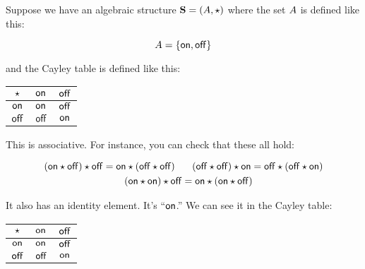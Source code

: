 \documentclass[../../../main.tex]{subfiles}
\begin{document}
\begin{fexample}

Suppose we have an algebraic structure $\algebra{S} = (\set{A}, \opSymbol/)$ where the set $A$ is defined like this:

\begin{equation*}
  A = \{ \mathsf{on}, \mathsf{off} \}
\end{equation*}

and the Cayley table is defined like this:

\begin{center}
  \begin{tabular}{| c || c | c | }
    \hline
    $\opSymbol/$ & $\mathsf{on}$  & $\mathsf{off}$ \\ \hline \hline
    $\mathsf{on}$     & $\mathsf{on}$  & $\mathsf{off}$ \\ \hline
    $\mathsf{off}$    & $\mathsf{off}$ & $\mathsf{on}$ \\ \hline
  \end{tabular}
\end{center}

This is associative. For instance, you can check that these all hold:

\begin{align*}
  \op{(\op{\e{on}}{\e{off}})}{\e{off}} = \op{\e{on}}{(\op{\e{off}}{\e{off}})} \hskip 0.25cm &~ \hskip 0.25cm
  \op{(\op{\e{off}}{\e{off}})}{\e{on}} = \op{\e{off}}{(\op{\e{off}}{\e{on}})} \\
  \op{(\op{\e{on}}{\e{on}})}{\e{off}} &= \op{\e{on}}{(\op{\e{on}}{\e{off}})}
\end{align*}

It also has an identity element. It's ``$\mathsf{on}$.'' We can see it in the Cayley table:

\begin{center}
  \begin{tabular}{| c || c | c | }
    \hline
    $\opSymbol/$ & $\mathsf{on}$  & $\mathsf{off}$ \\ \hline \hline
    $\mathsf{on}$     & \cellcolor{grey3} $\mathsf{on}$  & \cellcolor{grey3} $\mathsf{off}$ \\ \hline
    $\mathsf{off}$    & \cellcolor{grey3} $\mathsf{off}$ & $\mathsf{on}$ \\ \hline
  \end{tabular}
\end{center}

\end{fexample}
\end{document}
